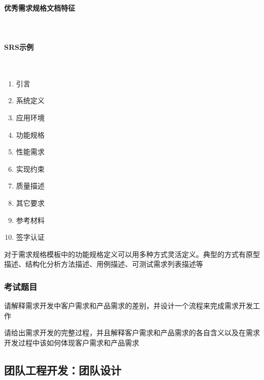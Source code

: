 \paragraph{优秀需求规格文档特征}~{} \par


\paragraph{SRS示例}~{} \par
\vspace{-0.8em}
\begin{multicols}{5}
    \begin{enumerate}[label=\arabic*.]
        \item 引言
        \item 系统定义
        \item 应用环境
        \item 功能规格
        \item 性能需求
        \item 实现约束
        \item 质量描述
        \item 其它要求
        \item 参考材料
        \item 签字认证
    \end{enumerate}
\end{multicols}
\vspace{-1em}

对于需求规格模板中的功能规格定义可以用多种方式灵活定义。典型的方式有原型描述、结构化分析方法描述、用例描述、可测试需求列表描述等

\subsubsection{考试题目}
\begin{problem}
请解释需求开发中客户需求和产品需求的差别，并设计一个流程来完成需求开发工作
\end{problem}

\begin{problem}
请给出需求开发的完整过程，并且解释客户需求和产品需求的各自含义以及在需求开发过程中该如何体现客户需求和产品需求
\end{problem}

\subsection{团队工程开发：团队设计}

